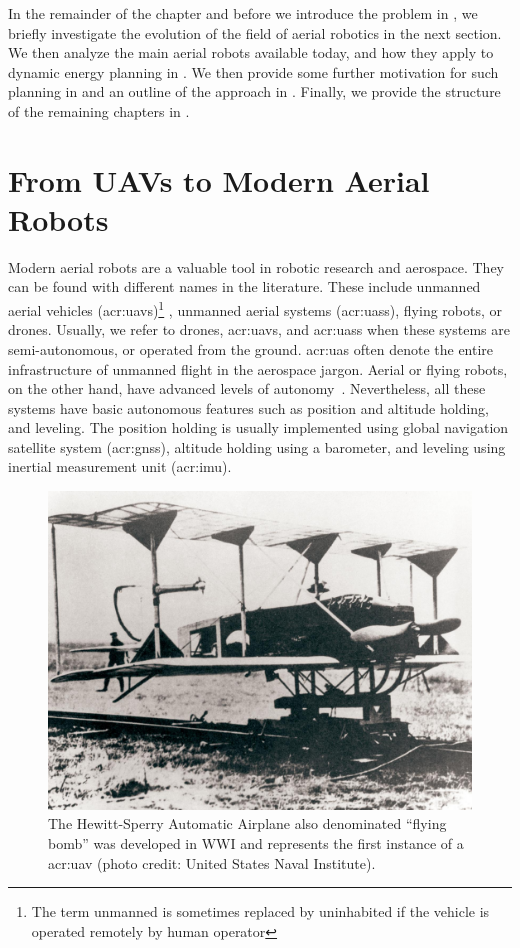 In the remainder of the chapter and before we introduce the problem in , we briefly investigate the evolution of the field of aerial robotics in the next section. We then analyze the main aerial robots available today, and how they apply to dynamic energy planning in . We then provide some further motivation for such planning in  and an outline of the approach in . Finally, we provide the structure of the remaining chapters in .

\section{From UAVs to Modern Aerial Robots}

Modern aerial robots are a valuable tool in robotic research and aerospace. They can be found with different names in the literature. These include unmanned aerial vehicles (\Gls{acr:uav}s)\footnote{The term unmanned is sometimes replaced by uninhabited if the vehicle is operated remotely by human operator}%
, unmanned aerial systems (\Gls{acr:uas}s), flying robots, or drones. Usually, we refer to drones, \Gls{acr:uav}s, and \Gls{acr:uas}s when these systems are semi-autonomous, or operated from the ground. \Gls{acr:uas} often denote the entire infrastructure of unmanned flight in the aerospace jargon. Aerial or flying robots, on the other hand, have advanced levels of autonomy~\citep{siciliano2016springer}. Nevertheless, all these systems have basic autonomous features such as position and altitude holding, and leveling. The position holding is usually implemented using global navigation satellite system (\Gls{acr:gnss}), altitude holding using a barometer, and leveling using inertial measurement unit (\Gls{acr:imu}).

\begin{figure}[t]
  \centering
  \includegraphics[width=.7\textwidth]{pictures/HA-NH-JA-19_1}
  \caption[Hewitt-Sperry Automatic Airplane, first unmanned flying machine]{The Hewitt-Sperry Automatic Airplane also denominated ``flying bomb'' was developed in WWI and represents the first instance of a \Gls{acr:uav} {\scriptsize(photo credit: United States Naval Institute)}.}   
  \label{fig:hewitt-sperry}
\end{figure}

